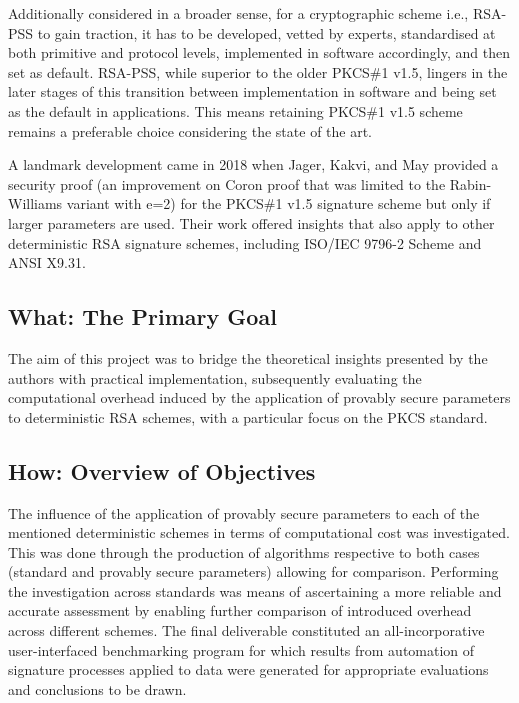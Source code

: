 \documentclass[]{final_report}
\theoremstyle{definition}
\begin{document}
Additionally considered in a broader sense, for  a cryptographic scheme i.e., RSA-PSS to gain traction, it has to be developed, vetted by experts, standardised at both primitive and protocol levels, implemented in software accordingly, and then set as default. RSA-PSS, while superior to the older PKCS\#1 v1.5, lingers in the later stages of this transition between implementation in software and being set as the default in applications. This means retaining PKCS\#1 v1.5 scheme remains a preferable choice considering the state of the art.

A landmark development came in 2018 when Jager, Kakvi, and May \cite{jager2018security} provided a security proof (an improvement on Coron \cite{coron2002security} proof that was limited to the Rabin-Williams variant with e=2) for the PKCS\#1 v1.5 signature scheme but only if larger parameters are used. Their work offered insights that also apply to other deterministic RSA signature schemes, including ISO/IEC 9796-2 Scheme and ANSI X9.31.

\subsection{What: The Primary Goal}
The aim of this project was to bridge the theoretical insights presented by the authors \cite{jager2018security} with practical implementation, subsequently evaluating the computational overhead induced by the application of provably secure parameters to deterministic RSA schemes, with a particular focus on the PKCS standard. 

\subsection{How: Overview of Objectives}
The influence of the application of provably secure parameters to each of the mentioned deterministic schemes in terms of computational cost was investigated. This was done through the production of algorithms respective to both cases (standard and provably secure parameters) allowing for comparison. Performing the investigation across standards was means of ascertaining a more reliable and accurate assessment by enabling further comparison of introduced overhead across different schemes. The final deliverable constituted an all-incorporative user-interfaced benchmarking program for which results from automation of signature processes applied to data were generated for appropriate evaluations and conclusions to be drawn.
\end{document}
